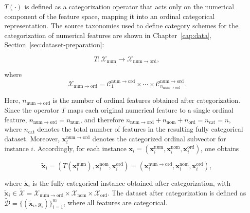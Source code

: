 $T(\cdot)$ is defined as a categorization operator that acts only on the numerical component of the feature space, mapping it into an ordinal categorical representation. The source taxonomies used to define category schemes for the categorization of numerical features are shown in Chapter~\ref{cap:data}, Section~\ref{sec:dataset-preparation}:

\begin{equation}
  T: \mathcal{X}_{\mathrm{num}} \rightarrow \mathcal{X}_{\mathrm{num} \rightarrow \mathrm{ord}},
\end{equation}

where
\begin{equation}
  \mathcal{X}_{\mathrm{num} \rightarrow \mathrm{ord}} = \mathcal{C}_1^{\mathrm{num} \rightarrow \mathrm{ord}} \times \cdots \times \mathcal{C}_{n_{\mathrm{num} \rightarrow \mathrm{ord}}}^{\mathrm{num} \rightarrow \mathrm{ord}}.
\end{equation}

Here, $n_{\mathrm{num} \rightarrow \mathrm{ord}}$ is the number of ordinal features obtained after categorization. Since the operator $T$ maps each original numerical feature to a single ordinal feature, $n_{\mathrm{num} \rightarrow \mathrm{ord}} = n_{\mathrm{num}}$, and therefore $n_{\mathrm{num} \rightarrow \mathrm{ord}} + n_{\mathrm{nom}} + n_{\mathrm{ord}} = n_{\mathrm{cat}} = n$, where $n_{\mathrm{cat}}$ denotes the total number of features in the resulting fully categorical dataset. Moreover, $\mathbf{x}_i^{\mathrm{num} \rightarrow \mathrm{ord}}$ denotes the categorized ordinal subvector for instance $i$. Accordingly, for each instance $\mathbf{x}_i = (\mathbf{x}_i^{\mathrm{num}},\mathbf{x}_i^{\mathrm{nom}},\mathbf{x}_i^{\mathrm{ord}})$, one obtains

\begin{equation}
  \tilde{\mathbf{x}}_i = (T(\mathbf{x}_i^{\mathrm{num}}),\mathbf{x}_i^{\mathrm{nom}},\mathbf{x}_i^{\mathrm{ord}})
  = (\mathbf{x}_i^{\mathrm{num} \rightarrow \mathrm{ord}},\mathbf{x}_i^{\mathrm{nom}},\mathbf{x}_i^{\mathrm{ord}}),
\end{equation}

where $\tilde{\mathbf{x}}_i$ is the fully categorical instance obtained after categorization, with $\tilde{\mathbf{x}}_i \in \widetilde{\mathcal{X}} = \mathcal{X}_{\mathrm{num} \rightarrow \mathrm{ord}} \times \mathcal{X}_{\mathrm{nom}} \times \mathcal{X}_{\mathrm{ord}}$. The dataset after categorization is defined as $\widetilde{\mathcal{D}} = \{(\tilde{\mathbf{x}}_i, y_i)\}_{i = 1}^{m}$, where all features are categorical.

